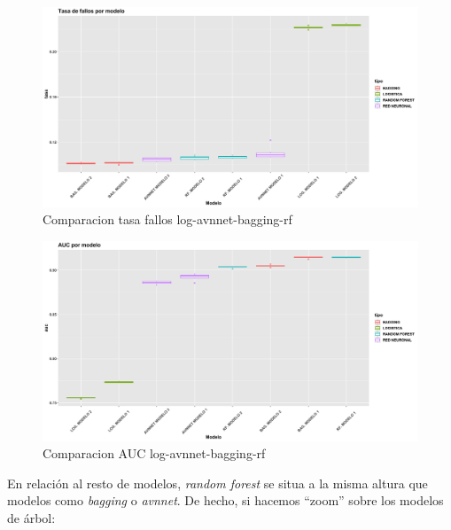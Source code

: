 \documentclass[
]{article}
\begin{document}
\begin{figure}[h!]

{\centering \includegraphics[width=0.99\linewidth,height=0.99\textheight,]{./charts/comparativas/03_log_avnnet_bagging_rf_tasa} 

}

\caption{Comparacion tasa fallos log-avnnet-bagging-rf}\label{fig:unnamed-chunk-103}
\end{figure}
\begin{figure}[h!]

{\centering \includegraphics[width=0.99\linewidth,height=0.99\textheight,]{./charts/comparativas/03_log_avnnet_bagging_rf_auc} 

}

\caption{Comparacion AUC log-avnnet-bagging-rf}\label{fig:unnamed-chunk-104}
\end{figure}

En relación al resto de modelos, \emph{random forest} se situa a la
misma altura que modelos como \emph{bagging} o \emph{avnnet}. De hecho,
si hacemos ``zoom'' sobre los modelos de árbol:
\end{document}
